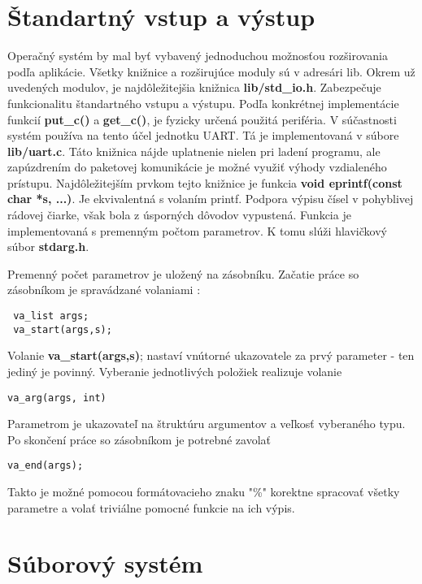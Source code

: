 \section {Štandartný vstup a výstup}

Operačný systém by mal byť vybavený jednoduchou možnosťou rozširovania podľa aplikácie. Všetky knižnice a rozširujúce moduly sú v adresári lib. Okrem už uvedených modulov, je najdôležitejšia knižnica \textbf{lib/std\_io.h}. Zabezpečuje funkcionalitu štandartného vstupu a výstupu. Podľa konkrétnej implementácie funkcií \textbf{put\_c()} a \textbf{get\_c()}, je fyzicky určená použitá periféria. V súčastnosti systém používa na tento účel jednotku UART. Tá je implementovaná v súbore \textbf{lib/uart.c}.
Táto knižnica nájde uplatnenie nielen pri ladení programu, ale zapúzdrením do paketovej komunikácie je možné využiť výhody vzdialeného prístupu. Najdôležitejším prvkom tejto knižnice je funkcia \textbf{void eprintf(const char *s, ...)}. Je ekvivalentná s volaním printf. Podpora výpisu čísel v pohyblivej rádovej čiarke, však bola z úsporných dôvodov vypustená. Funkcia je implementovaná s premenným počtom parametrov. K tomu slúži hlavičkový súbor \textbf{stdarg.h}.

Premenný počet parametrov je uložený na zásobníku. Začatie práce so zásobníkom je spravádzané volaniami :
{\small
\begin{verbatim}
 va_list args;
 va_start(args,s);
\end{verbatim}
}

Volanie \textbf{va\_start(args,s)}; nastaví vnútorné ukazovatele za prvý parameter - ten jediný je povinný. Vyberanie jednotlivých položiek realizuje volanie 
{\small
\begin{verbatim}
va_arg(args, int)
\end{verbatim}
}

Parametrom je ukazovateľ na štruktúru argumentov a veľkosť vyberaného typu. Po skončení práce so zásobníkom je potrebné zavolať
{\small
\begin{verbatim}
va_end(args);
\end{verbatim}
}

Takto je možné pomocou formátovacieho znaku "\%" korektne spracovať všetky parametre a volať triviálne pomocné funkcie na ich výpis.

\section {Súborový systém}

